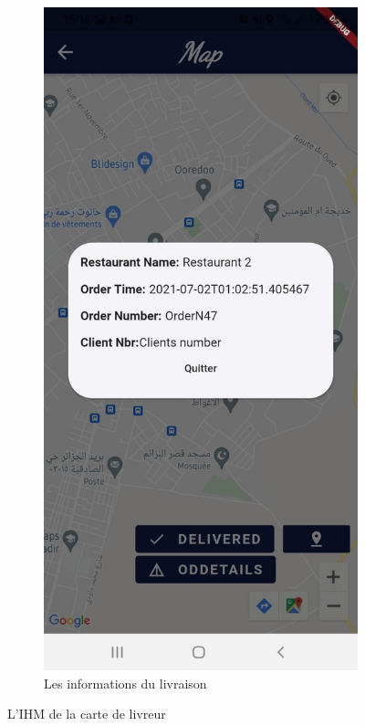 \documentclass[french, a4paper, 12pt]{report}
\begin{document}
\begin{figure}[h!]
\begin{subfigure}{.5\textwidth}
  \centering
  \includegraphics[width=.9\linewidth]{screenshots/DeliveryViews/DeliveryInformation.jpg}
  \caption{Les informations du livraison}
  \label{fig:delinf}
\end{subfigure}
			
			\caption{L'IHM de la carte de livreur}
			\label{fig:delimp}
		\end{figure}
		
\end{document}
